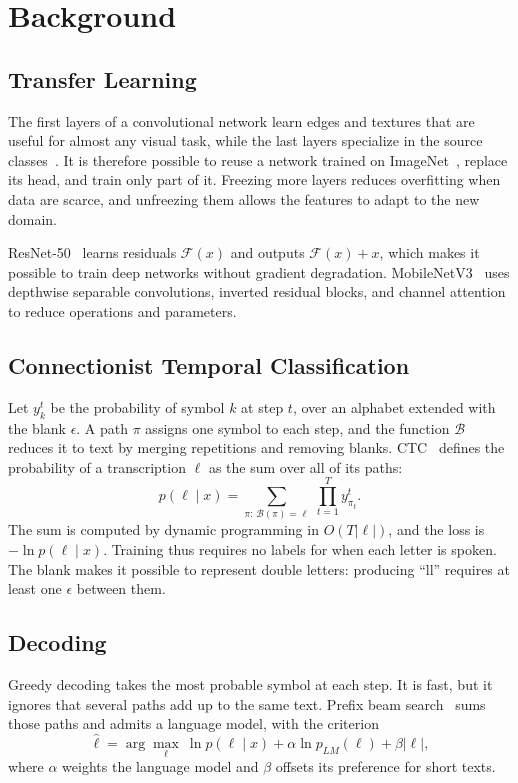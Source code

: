 \section{Background}\label{sec:teoria}

\subsection{Transfer Learning}
The first layers of a convolutional network learn edges and textures that are useful for almost any visual task, while the last layers specialize in the source classes~\cite{yosinski}. It is therefore possible to reuse a network trained on ImageNet~\cite{imagenet}, replace its head, and train only part of it. Freezing more layers reduces overfitting when data are scarce, and unfreezing them allows the features to adapt to the new domain.

ResNet-50~\cite{resnet} learns residuals $\mathcal{F}(x)$ and outputs $\mathcal{F}(x)+x$, which makes it possible to train deep networks without gradient degradation. MobileNetV3~\cite{mobilenet} uses depthwise separable convolutions, inverted residual blocks, and channel attention to reduce operations and parameters.

\subsection{Connectionist Temporal Classification}
Let $y^t_k$ be the probability of symbol $k$ at step $t$, over an alphabet extended with the blank $\epsilon$. A path $\pi$ assigns one symbol to each step, and the function $\mathcal{B}$ reduces it to text by merging repetitions and removing blanks. CTC~\cite{ctc} defines the probability of a transcription $\ell$ as the sum over all of its paths:
\begin{equation}
p(\ell\mid x)=\sum_{\pi:\,\mathcal{B}(\pi)=\ell}\ \prod_{t=1}^{T} y^t_{\pi_t}.
\end{equation}
The sum is computed by dynamic programming in $O(T|\ell|)$, and the loss is $-\ln p(\ell\mid x)$. Training thus requires no labels for when each letter is spoken. The blank makes it possible to represent double letters: producing ``ll'' requires at least one $\epsilon$ between them.

\subsection{Decoding}
Greedy decoding takes the most probable symbol at each step. It is fast, but it ignores that several paths add up to the same text. Prefix beam search~\cite{beam} sums those paths and admits a language model, with the criterion
\begin{equation}
\hat{\ell}=\arg\max_{\ell}\ \ln p(\ell\mid x)+\alpha\ln p_{LM}(\ell)+\beta|\ell|,
\end{equation}
where $\alpha$ weights the language model and $\beta$ offsets its preference for short texts.

